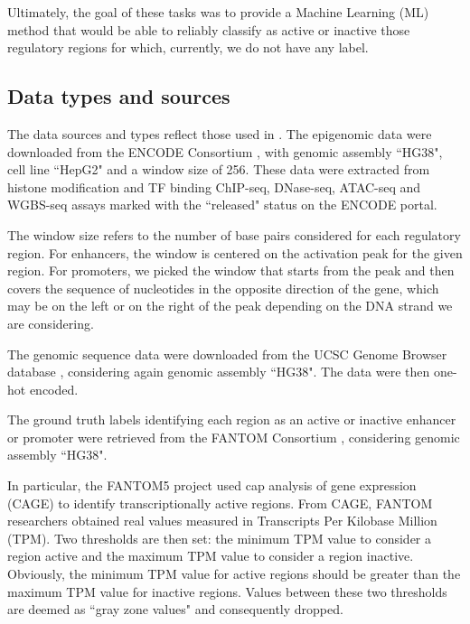 \documentclass{article}
\begin{document}
Ultimately, the goal of these tasks was to provide a Machine Learning (ML) method that would be able to reliably classify as active or inactive those regulatory regions for which, currently, we do not have any label.


\subsection{Data types and sources}
\label{subsec:exp:data}

The data sources and types reflect those used in \cite{cappelletti20, li_wasserman18}. The epigenomic data were downloaded from the ENCODE Consortium \cite{encode12, encode17}, with genomic assembly  “HG38", cell line  “HepG2" and a window size of 256. These data were extracted from histone modification and TF binding ChIP-seq, DNase-seq, ATAC-seq and WGBS-seq assays marked with the  “released" status on the ENCODE portal.

The window size refers to the number of base pairs considered for each regulatory region. For enhancers, the window is centered on the activation peak for the given region. For promoters, we picked the window that starts from the peak and then covers the sequence of nucleotides in the opposite direction of the gene, which may be on the left or on the right of the peak depending on the DNA strand we are considering.    

The genomic sequence data were downloaded from the UCSC Genome Browser database \cite{ucsc20}, considering again genomic assembly  “HG38". The data were then one-hot encoded.

The ground truth labels identifying each region as an active or inactive enhancer or promoter were retrieved from the FANTOM Consortium \cite{fantom15, fantom18}, considering genomic assembly  “HG38". 

In particular, the FANTOM5 project used cap analysis of gene expression (CAGE) to identify transcriptionally active regions. From CAGE, FANTOM researchers obtained real values measured in Transcripts Per Kilobase Million (TPM). Two thresholds are then set: the minimum TPM value to consider a region active and the maximum TPM value to consider a region inactive. Obviously, the minimum TPM value for active regions should be greater than the maximum TPM value for inactive regions. Values between these two thresholds are deemed as  “gray zone values" and consequently dropped.
\end{document}
